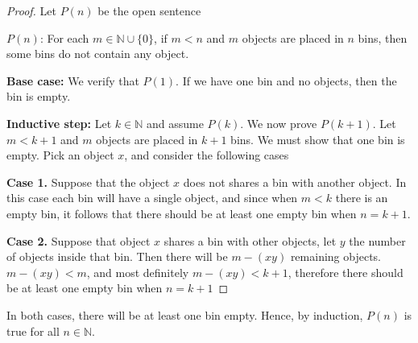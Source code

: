 \documentclass[12pt,oneside]{article}
\newcommand{\N}{\mathbb{N}}
\begin{document}
\begin{proof}
Let $P(n)$ be the open sentence

$P(n)$: For each $m \in \N \cup \{0\}$, if $m < n$ and $m$ objects are placed in $n$ bins, then some bins do not contain any object.

\textbf{Base case:} We verify that $P(1)$. If we have one bin and no objects, then the bin is empty.

\textbf{Inductive step:} Let $k \in \N$ and assume $P(k)$. We now prove $P(k+1)$. Let $m < k+1$ and $m$ objects are placed in $k+1$ bins. We must show that one bin is empty. Pick an object $x$, and consider the following cases

\textbf{Case 1.} Suppose that the object $x$ does not shares a bin with another object. In this case each bin will have a single object, and since when $m < k$ there is an empty bin, it follows that there should be at least one empty bin when $n = k+1$.

\textbf{Case 2.} Suppose that object $x$ shares a bin with other objects, let $y$ the number of objects inside that bin. Then there will be $m - (xy)$ remaining objects. $m - (xy) < m$, and most definitely $m - (xy) < k + 1$, therefore there should be at least one empty bin when $n = k+1$
\end{proof}

In both cases, there will be at least one bin empty. Hence, by induction, $P(n)$ is true for all $n \in \N$.


\end{document}
